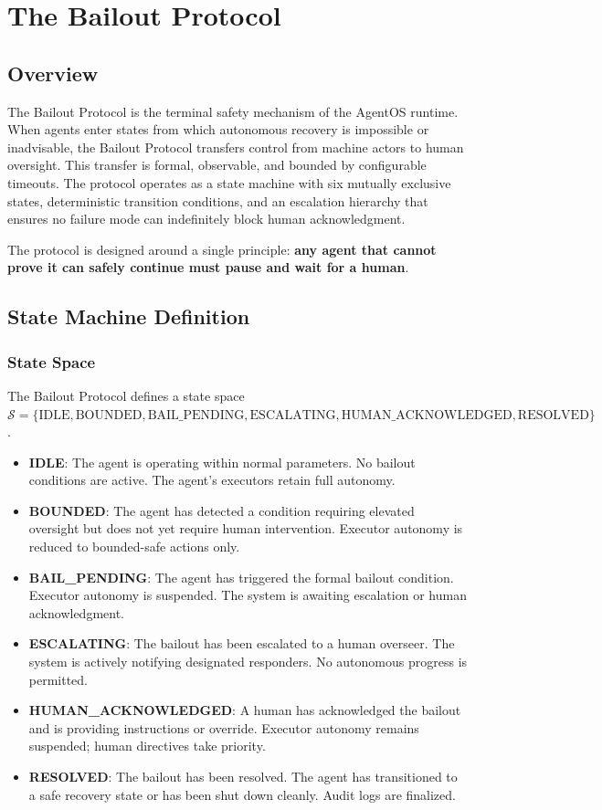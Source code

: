 \section{The Bailout Protocol}

\subsection{Overview}

The Bailout Protocol is the terminal safety mechanism of the AgentOS runtime. When agents enter states from which autonomous recovery is impossible or inadvisable, the Bailout Protocol transfers control from machine actors to human oversight. This transfer is formal, observable, and bounded by configurable timeouts. The protocol operates as a state machine with six mutually exclusive states, deterministic transition conditions, and an escalation hierarchy that ensures no failure mode can indefinitely block human acknowledgment.

The protocol is designed around a single principle: \textbf{any agent that cannot prove it can safely continue must pause and wait for a human}.

\subsection{State Machine Definition}

\subsubsection{State Space}

The Bailout Protocol defines a state space $\mathcal{S} = \{\text{IDLE}, \text{BOUNDED}, \text{BAIL\_PENDING}, \text{ESCALATING}, \text{HUMAN\_ACKNOWLEDGED}, \text{RESOLVED}\}$.

\begin{itemize}
  \item \textbf{IDLE}: The agent is operating within normal parameters. No bailout conditions are active. The agent's executors retain full autonomy.
  \item \textbf{BOUNDED}: The agent has detected a condition requiring elevated oversight but does not yet require human intervention. Executor autonomy is reduced to bounded-safe actions only.
  \item \textbf{BAIL\_PENDING}: The agent has triggered the formal bailout condition. Executor autonomy is suspended. The system is awaiting escalation or human acknowledgment.
  \item \textbf{ESCALATING}: The bailout has been escalated to a human overseer. The system is actively notifying designated responders. No autonomous progress is permitted.
  \item \textbf{HUMAN\_ACKNOWLEDGED}: A human has acknowledged the bailout and is providing instructions or override. Executor autonomy remains suspended; human directives take priority.
  \item \textbf{RESOLVED}: The bailout has been resolved. The agent has transitioned to a safe recovery state or has been shut down cleanly. Audit logs are finalized.
\end{itemize}

